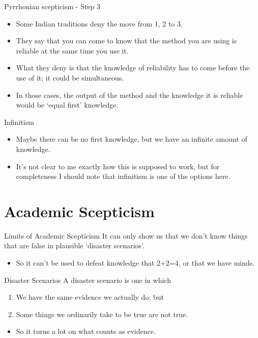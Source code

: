 \documentclass[
  17pt,
  letterpaper,
  ignorenonframetext,
  aspectratio=169,
  handout]{beamer}
\providecommand{\tightlist}{%
  \setlength{\itemsep}{0pt}\setlength{\parskip}{0pt}}\usepackage{longtable,booktabs,array}
\begin{document}
\begin{frame}{Pyrrhonian scepticism - Step 3}
\protect\hypertarget{pyrrhonian-scepticism---step-3}{}
\begin{itemize}[<+->]
\tightlist
\item
  Some Indian traditions deny the move from 1, 2 to 3.
\item
  They say that you can come to know that the method you are using is
  reliable at the same time you use it.
\item
  What they deny is that the knowledge of reliability has to come before
  the use of it; it could be simultaneous.
\item
  In those cases, the output of the method and the knowledge it is
  reliable would be `equal first' knowledge.
\end{itemize}
\end{frame}

\begin{frame}{Infinitism}
\protect\hypertarget{infinitism}{}
\begin{itemize}[<+->]
\tightlist
\item
  Maybe there can be no first knowledge, but we have an infinite amount
  of knowledge.
\item
  It's not clear to me exactly how this is supposed to work, but for
  completeness I should note that infinitism is one of the options here.
\end{itemize}
\end{frame}

\hypertarget{academic-scepticism-1}{%
\section{Academic Scepticism}\label{academic-scepticism-1}}

\begin{frame}{Limits of Academic Scepticism}
\protect\hypertarget{limits-of-academic-scepticism}{}
It can only show us that we don't know things that are false in
plausible `disaster scenarios'.

\begin{itemize}[<+->]
\tightlist
\item
  So it can't be used to defeat knowledge that 2+2=4, or that we have
  minds.
\end{itemize}
\end{frame}

\begin{frame}{Disaster Scenarios}
\protect\hypertarget{disaster-scenarios}{}
A disaster scenario is one in which

\begin{enumerate}[<+->]
\tightlist
\item
  We have the same evidence we actually do; but
\item
  Some things we ordinarily take to be true are not true.
\end{enumerate}

\begin{itemize}[<+->]
\tightlist
\item
  So it turns a lot on what counts as evidence.
\end{itemize}
\end{frame}
\end{document}
